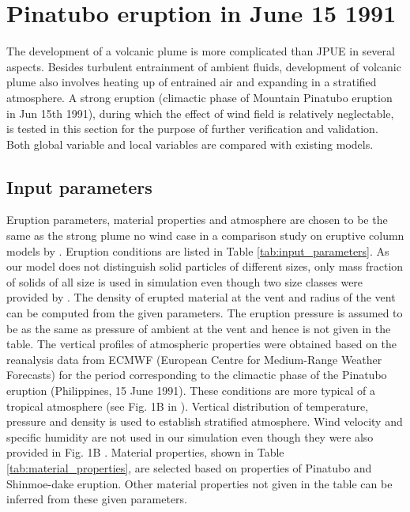 \section{Pinatubo eruption in June 15 1991}
The development of a volcanic plume is more complicated than JPUE in several aspects. Besides turbulent entrainment of ambient fluids, development of volcanic plume also involves heating up of entrained air and expanding in a stratified atmosphere. A strong eruption (climactic phase of Mountain Pinatubo eruption in Jun 15th 1991), during which the effect of wind field is relatively neglectable, is tested in this section for the purpose of further verification and validation.
Both global variable and local variables are compared with existing models.

\subsection{Input parameters}
Eruption parameters, material properties and atmosphere are chosen to be the same as the strong plume no wind case in a comparison study on eruptive column models by \citet {costa2016results}. Eruption conditions are listed in Table \ref{tab:input_parameters}. As our model does not distinguish solid particles of different sizes, only mass fraction of solids of all size is used in simulation even though two size classes were provided by \citet {costa2016results}. The density of erupted material at the vent and radius of the vent can be computed from the given parameters. The eruption pressure is assumed to be as the same as pressure of ambient at the vent and hence is not given in the table. The vertical profiles of atmospheric properties were obtained based on the reanalysis data from ECMWF (European Centre for Medium-Range Weather Forecasts) for the period corresponding to the climactic phase of the Pinatubo eruption (Philippines, 15 June 1991). These conditions are more typical of a tropical atmosphere (see Fig. 1B in \citep{costa2016results}).  
Vertical distribution of temperature, pressure and density is used to establish stratified atmosphere. Wind velocity and specific humidity are not used in our simulation even though they were also provided in Fig. 1B \citep{costa2016results}. Material properties, shown in Table \ref{tab:material_properties}, are selected based on properties of Pinatubo and Shinmoe-dake eruption. Other material properties not given in the table can be inferred from these given parameters.

